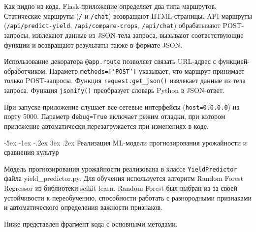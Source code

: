 \documentclass[14pt, a4paper]{extarticle}
\makeatletter
\renewcommand\subsection{\@startsection {subsection}{2}{\z@}%
    {-5ex \@plus -1ex \@minus -.2ex}%
    {3ex \@plus.2ex}%
    {\centering\large\bfseries}}
\makeatother
\begin{document}
    Как видно из кода, Flask-приложение определяет два типа маршрутов. Статические маршруты (\texttt{/} и \texttt{/chat}) возвращают HTML-страницы. API-маршруты (\texttt{/api/predict-yield}, \texttt{/api/compare-crops}, \texttt{/api/chat}) обрабатывают POST-запросы, извлекают данные из JSON-тела запроса, вызывают соответствующие функции и возвращают результаты также в формате JSON.

    Использование декоратора \texttt{@app.route} позволяет связать URL-адрес с функцией-обработчиком. Параметр \texttt{methods=['POST']} указывает, что маршрут принимает только POST-запросы. Функция \texttt{request.get\_json()} извлекает данные из тела запроса. Функция \texttt{jsonify()} преобразует словарь Python в JSON-ответ.

    При запуске приложение слушает все сетевые интерфейсы (\texttt{host=0.0.0.0}) на порту 5000. Параметр \texttt{debug=True} включает режим отладки, при котором приложение автоматически перезагружается при изменениях в коде.

\subsection{Реализация ML-модели прогнозирования урожайности и сравнения культур}

    Модель прогнозирования урожайности реализована в классе \texttt{YieldPredictor} файла yield\_predictor.py. Для обучения используется алгоритм Random Forest Regressor из библиотеки scikit-learn. Random Forest был выбран из-за своей устойчивости к переобучению, способности работать с разнородными признаками и автоматического определения важности признаков.

    Ниже представлен фрагмент кода с основными методами.
\end{document}
